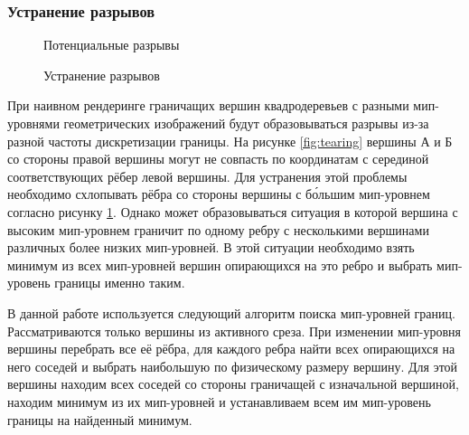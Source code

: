 \documentclass[12pt]{extarticle}
\begin{document}
\subsubsection{Устранение разрывов}
\begin{figure}[ht]
  \centering
  \caption{Потенциальные разрывы}
  \label{fig:tearing}
\endminipage\hfill
%
  \centering
  \caption{Устранение разрывов}
  \label{fig:stitching}
\endminipage
\end{figure}
При наивном рендеринге граничащих вершин квадродеревьев с разными мип-уровнями геометрических изображений будут образовываться разрывы из-за разной частоты дискретизации границы. На рисунке \ref{fig:tearing} вершины А и Б со стороны правой вершины могут не совпасть по координатам с серединой соответствующих рёбер левой вершины. Для устранения этой проблемы необходимо схлопывать рёбра со стороны вершины с б\'ольшим мип-уровнем согласно рисунку \ref{fig:stitching}. Однако может образовываться ситуация в которой вершина с высоким мип-уровнем граничит по одному ребру с несколькими вершинами различных более низких мип-уровней. В этой ситуации необходимо взять минимум из всех мип-уровней вершин опирающихся на это ребро и выбрать мип-уровень границы именно таким.

В данной работе используется следующий алгоритм поиска мип-уровней границ. Рассматриваются только вершины из активного среза. При изменении мип-уровня вершины перебрать все её рёбра, для каждого ребра найти всех опирающихся на него соседей и выбрать наибольшую по физическому размеру вершину. Для этой вершины находим всех соседей со стороны граничащей с изначальной вершиной, находим минимум из их мип-уровней и устанавливаем всем им мип-уровень границы на найденный минимум.
\end{document}
